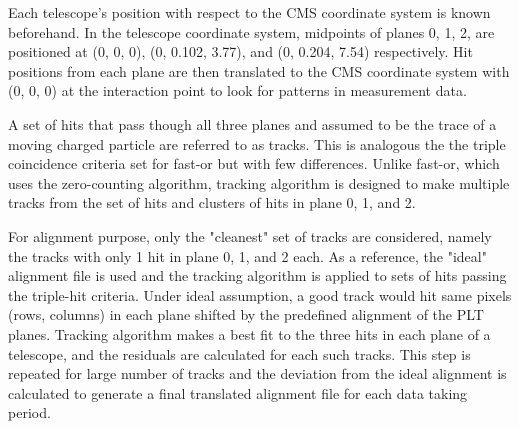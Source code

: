 Each telescope's position with respect to the CMS coordinate system is known beforehand. In the telescope coordinate system, midpoints of planes 0, 1, 2, are positioned at (0, 0, 0), (0, 0.102, 3.77), and (0, 0.204, 7.54) respectively. Hit positions from each plane are then translated to the CMS coordinate system with (0, 0, 0) at the interaction point to look for patterns in measurement data.


A set of hits that pass though all three planes and assumed to be the trace of a moving charged particle are referred to as tracks. This is analogous the the triple coincidence criteria set for fast-or but with few differences. Unlike fast-or, which uses the zero-counting algorithm, tracking algorithm is designed to make multiple tracks from the set of hits and clusters of hits in plane 0, 1, and 2. 
 
For alignment purpose, only the "cleanest" set of tracks are considered, namely the tracks with only 1 hit in plane 0, 1, and 2 each. As a reference, the "ideal" alignment file is used and the tracking algorithm is applied to sets of hits passing the triple-hit criteria. Under ideal assumption, a good track would hit same pixels (rows, columns) in each plane shifted by the predefined alignment of the PLT planes. Tracking algorithm makes a best fit to the three hits in each plane of a telescope, and the residuals are calculated for each such tracks. This step is repeated for large number of tracks and the deviation from the ideal alignment is calculated to generate a final translated alignment file for each data taking period.






